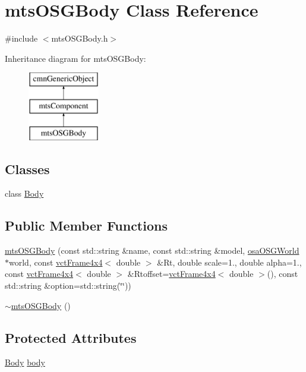 \hypertarget{classmts_o_s_g_body}{}\section{mts\+O\+S\+G\+Body Class Reference}
\label{classmts_o_s_g_body}


{\ttfamily \#include $<$mts\+O\+S\+G\+Body.\+h$>$}

Inheritance diagram for mts\+O\+S\+G\+Body\+:\begin{figure}[H]
\begin{center}
\leavevmode
\includegraphics[height=3.000000cm]{df/dec/classmts_o_s_g_body}
\end{center}
\end{figure}
\subsection*{Classes}
\begin{DoxyCompactItemize}
\item 
class \hyperlink{classmts_o_s_g_body_1_1_body}{Body}
\end{DoxyCompactItemize}
\subsection*{Public Member Functions}
\begin{DoxyCompactItemize}
\item 
\hyperlink{classmts_o_s_g_body_a644b4d5bbe292777404390986a520948}{mts\+O\+S\+G\+Body} (const std\+::string \&name, const std\+::string \&model, \hyperlink{classosa_o_s_g_world}{osa\+O\+S\+G\+World} $\ast$world, const \hyperlink{classvct_frame4x4}{vct\+Frame4x4}$<$ double $>$ \&Rt, double scale=1., double alpha=1., const \hyperlink{classvct_frame4x4}{vct\+Frame4x4}$<$ double $>$ \&Rtoffset=\hyperlink{classvct_frame4x4}{vct\+Frame4x4}$<$ double $>$(), const std\+::string \&option=std\+::string(\char`\"{}\char`\"{}))
\item 
\hyperlink{classmts_o_s_g_body_a0d16a20751fe85b131ec458802465a6f}{$\sim$mts\+O\+S\+G\+Body} ()
\end{DoxyCompactItemize}
\subsection*{Protected Attributes}
\begin{DoxyCompactItemize}
\item 
\hyperlink{classmts_o_s_g_body_1_1_body}{Body} \hyperlink{classmts_o_s_g_body_ae3a847023812fbfa11686c769d97f34e}{body}
\end{DoxyCompactItemize}
